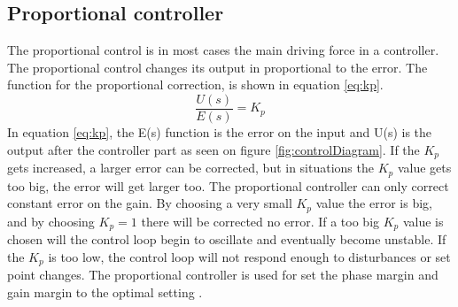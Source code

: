 \subsection*{Proportional controller}
The proportional control is in most cases the main driving force in a controller. The proportional control changes its output in proportional to the error. 
The function for the proportional correction, is shown in equation \ref{eq:kp}.
\begin{equation}\label{eq:kp}
    \frac{U(s)}{E(s)}=K_p
\end{equation}
In equation \ref{eq:kp}, the E(s) function is the error on the input and U(s) is the output after the controller part as seen on figure \ref{fig:controlDiagram}.
If the $K_p$ gets increased, a larger error can be corrected, but in situations the $K_p$ value gets too big, the error will get larger too. The proportional controller can only correct constant error on the gain. By choosing a very small $K_p$ value the error is big, and by choosing $K_p=1$ there will be corrected no error. If a too big $K_p$ value is chosen will the control loop begin to oscillate and eventually become unstable. If the $K_p$ is too low, the control loop will not respond enough to disturbances or set point changes. The proportional controller is used for set the phase margin and gain margin to the optimal setting \cite{digital_control}. 


